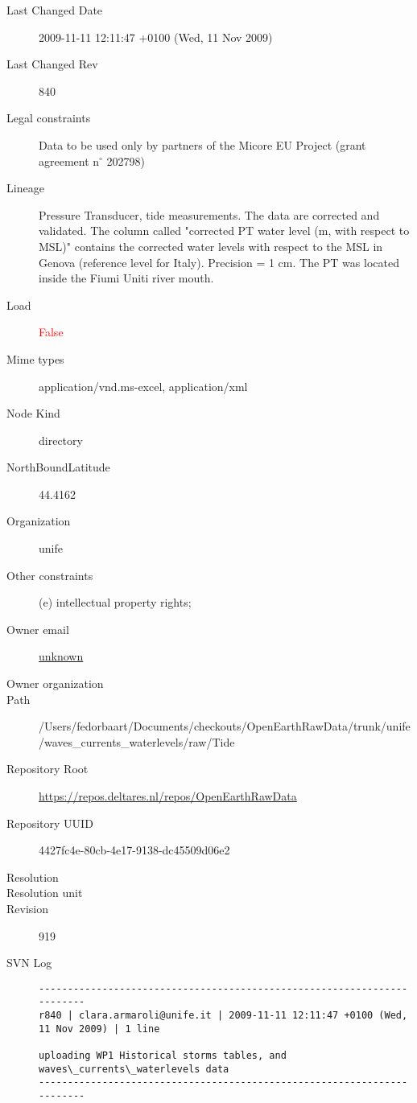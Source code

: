 \documentclass[9]{report}
\begin{document}
\begin{description}
  \item[Last Changed Date] 2009-11-11 12:11:47 +0100 (Wed, 11 Nov 2009)
  \item[Last Changed Rev] 840
  \item[Legal constraints] Data to be used only by partners of the Micore EU Project (grant agreement n\mbox{$^\circ$} 202798)
  \item[Lineage] Pressure Transducer, tide measurements. The data are corrected and validated. The column called "corrected PT water level (m, with respect to MSL)" contains the corrected water levels with respect to the MSL in Genova (reference level for Italy). Precision = 1 cm. The PT was located inside the Fiumi Uniti river mouth.
  \item[Load] \textcolor{red}{False}
  \item[Mime types] application/vnd.ms-excel, application/xml
  \item[Node Kind] directory
  \item[NorthBoundLatitude] 44.4162
  \item[Organization] unife
  \item[Other constraints] (e) intellectual property rights;
  \item[Owner email] \href{mailto:unknown}{unknown}
  \item[Owner organization] 
  \item[Path] /Users/fedorbaart/Documents/checkouts/OpenEarthRawData/trunk/unife/waves\_currents\_waterlevels/raw/Tide
  \item[Repository Root] \href{https://repos.deltares.nl/repos/OpenEarthRawData}{https://repos.deltares.nl/repos/OpenEarthRawData}
  \item[Repository UUID] 4427fc4e-80cb-4e17-9138-dc45509d06e2
  \item[Resolution] 
  \item[Resolution unit] 
  \item[Revision] 919
  \item[SVN Log] \begin{verbatim}
------------------------------------------------------------------------
r840 | clara.armaroli@unife.it | 2009-11-11 12:11:47 +0100 (Wed, 11 Nov 2009) | 1 line

uploading WP1 Historical storms tables, and waves\_currents\_waterlevels data
------------------------------------------------------------------------


\end{verbatim}
\end{description}
\end{document}
